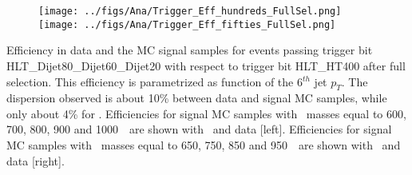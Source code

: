 \begin{frame}{}
\vspace{-.2cm}
\begin{figure}[!Hhtbp]
  \begin{center}
    \texttt{[image: ../figs/Ana/Trigger\_Eff\_hundreds\_FullSel.png]}
    \texttt{[image: ../figs/Ana/Trigger\_Eff\_fifties\_FullSel.png]}
  \end{center}
\end{figure}

\vspace{-.2cm}
    \begin{block}{}
      \tiny \centering Efficiency in data and the MC signal samples for events passing trigger bit HLT\_Dijet80\_Dijet60\_Dijet20 with respect to trigger bit HLT\_HT400 after full selection. This efficiency is parametrized as function of the 6$^{th}$ jet $p_{T}$. The dispersion observed is about 10\% between data and signal MC samples, while only about 4\%  for \ttbar. Efficiencies for signal MC samples with \Tp~masses equal to 600, 700, 800, 900 and 1000~\GeVcc~are shown with \ttbar~and data [left]. Efficiencies for signal MC samples with \Tp~masses equal to 650, 750, 850 and 950~\GeVcc~are shown with \ttbar~and data [right].
    \end{block}

\end{frame}



